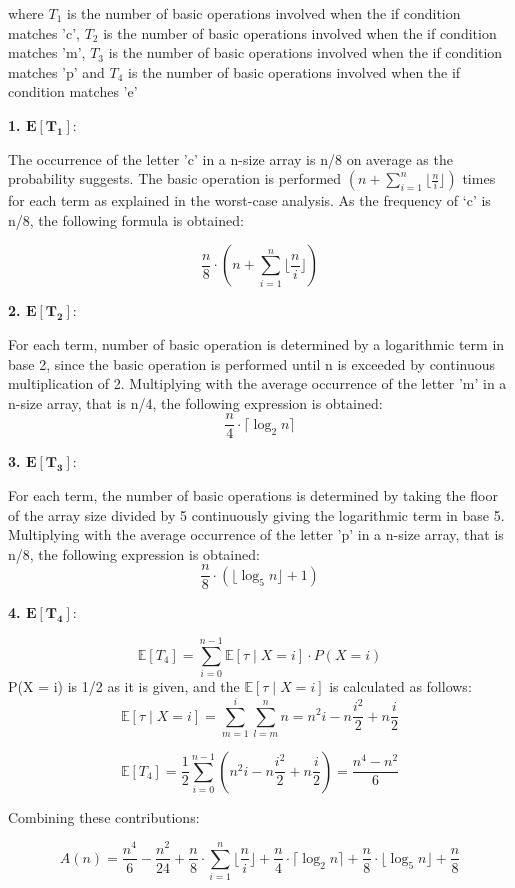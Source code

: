 \documentclass[11pt, oneside, a4paper]{article}
\begin{document}
 where $T_1$ is the number of basic operations involved when the if condition matches 'c', $T_2$ is the number of basic operations involved when the if condition matches 'm', $T_3$ is the number of basic operations involved when the if condition matches 'p' and $T_4$ is the number of basic operations involved when the if condition matches 'e'


\textbf{1. $\mathbf{E[T_1]}$}:


 The occurrence of the letter 'c' in a n-size array is n/8 on average as the probability suggests. The basic operation is performed \(( n +  \sum_{i=1}^{n} \lfloor\frac{n}{i} \rfloor)\) times for each term as explained in the worst-case analysis. As the frequency of ‘c’ is n/8, the following formula is obtained:
   
   \[
   \frac{n}{8} \cdot  ( n +  \sum_{i=1}^{n} \lfloor\frac{n}{i} \rfloor) \]

   


\textbf{2. $\mathbf{E[T_2]}$}:

 For each term, number of basic operation is determined by a logarithmic term in base 2, since the basic operation is performed until n is exceeded by continuous multiplication of 2. Multiplying with the average occurrence of the letter 'm' in a n-size array, that is n/4, the following expression is obtained: 
\[
\frac{n}{4} \cdot \lceil \log_2 n \rceil
\]

\textbf{3. $\mathbf{E[T_3]}$}:

For each term, the number of basic operations is determined by taking the floor of the array size divided by 5 continuously giving the logarithmic term in base 5. Multiplying with the average occurrence of the letter 'p' in a n-size array, that is n/8, the following expression is obtained: 
\[ 
\frac{n}{8} \cdot \left( \lfloor \log_5 n \rfloor + 1 \right)
\]

\textbf{4. $\mathbf{E[T_4]}$}:

\[
\mathbb{E}[T_4] = \sum_{i=0}^{n-1} \mathbb{E}[\tau \mid X=i] \cdot P(X=i)
\]
P(X = i) is 1/2 as it is given, and the $\mathbb{E}[\tau \mid X=i]$ is calculated as follows:
\[
\mathbb{E}[\tau \mid X=i] = \sum_{m=1}^{i} \sum_{l=m}^{n} n = n^2i - n\frac{i^2}{2} + n\frac{i}{2} 
\]

\[
\mathbb{E}[T_4] = \frac{1}{2} \sum _{i=0}^{n-1}( n^2i - n\frac{i^2}{2} + n\frac{i}{2} )= \frac{n^4 - n^2}{6}
\]

Combining these contributions:
     
\begin{equation*}
A(n) = \frac{n^4}{6} - \frac{n^2}{24} + \frac{n}{8} \cdot \sum_{i=1}^{n} \lfloor\frac{n}{i} \rfloor + \frac{n}{4} \cdot \lceil \log_2 n \rceil + \frac{n}{8} \cdot \lfloor \log_5 n \rfloor + \frac{n}{8}
\end{equation*}
\end{document}
